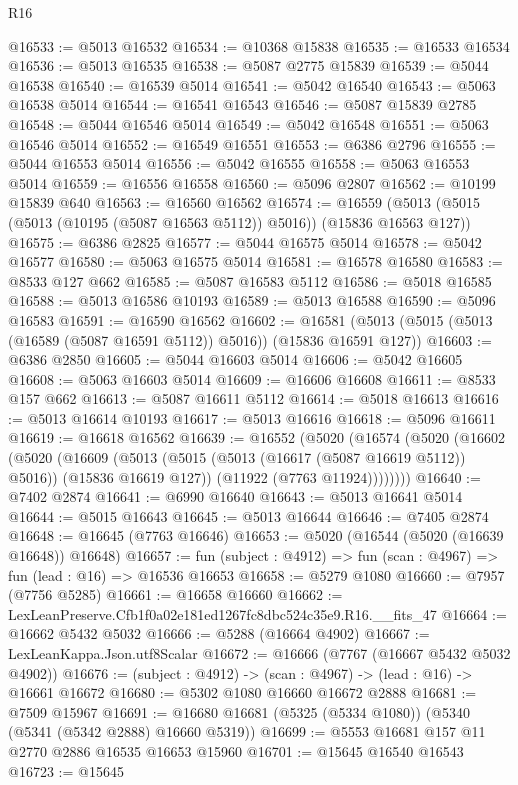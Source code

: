 \begin{lexlean}{R16}
\begin{coremodule}
@16533 := @5013 @16532
@16534 := @10368 @15838
@16535 := @16533 @16534
@16536 := @5013 @16535
@16538 := @5087 @2775 @15839
@16539 := @5044 @16538
@16540 := @16539 @5014
@16541 := @5042 @16540
@16543 := @5063 @16538 @5014
@16544 := @16541 @16543
@16546 := @5087 @15839 @2785
@16548 := @5044 @16546 @5014
@16549 := @5042 @16548
@16551 := @5063 @16546 @5014
@16552 := @16549 @16551
@16553 := @6386 @2796
@16555 := @5044 @16553 @5014
@16556 := @5042 @16555
@16558 := @5063 @16553 @5014
@16559 := @16556 @16558
@16560 := @5096 @2807
@16562 := @10199 @15839 @640
@16563 := @16560 @16562
@16574 := @16559 (@5013 (@5015 (@5013 (@10195 (@5087 @16563 @5112)) @5016)) (@15836 @16563 @127))
@16575 := @6386 @2825
@16577 := @5044 @16575 @5014
@16578 := @5042 @16577
@16580 := @5063 @16575 @5014
@16581 := @16578 @16580
@16583 := @8533 @127 @662
@16585 := @5087 @16583 @5112
@16586 := @5018 @16585
@16588 := @5013 @16586 @10193
@16589 := @5013 @16588
@16590 := @5096 @16583
@16591 := @16590 @16562
@16602 := @16581 (@5013 (@5015 (@5013 (@16589 (@5087 @16591 @5112)) @5016)) (@15836 @16591 @127))
@16603 := @6386 @2850
@16605 := @5044 @16603 @5014
@16606 := @5042 @16605
@16608 := @5063 @16603 @5014
@16609 := @16606 @16608
@16611 := @8533 @157 @662
@16613 := @5087 @16611 @5112
@16614 := @5018 @16613
@16616 := @5013 @16614 @10193
@16617 := @5013 @16616
@16618 := @5096 @16611
@16619 := @16618 @16562
@16639 := @16552
    (@5020
      (@16574
        (@5020
          (@16602
            (@5020
              (@16609
                (@5013 (@5015 (@5013 (@16617 (@5087 @16619 @5112)) @5016)) (@15836 @16619 @127))
                (@11922 (@7763 @11924))))))))
@16640 := @7402 @2874
@16641 := @6990 @16640
@16643 := @5013 @16641 @5014
@16644 := @5015 @16643
@16645 := @5013 @16644
@16646 := @7405 @2874
@16648 := @16645 (@7763 @16646)
@16653 := @5020 (@16544 (@5020 (@16639 @16648)) @16648)
@16657 := fun (subject : @4912) => fun (scan : @4967) => fun (lead : @16) => @16536 @16653
@16658 := @5279 @1080
@16660 := @7957 (@7756 @5285)
@16661 := @16658 @16660
@16662 := LexLeanPreserve.Cfb1f0a02e181ed1267fc8dbc524c35e9.R16.__fits_47
@16664 := @16662 @5432 @5032
@16666 := @5288 (@16664 @4902)
@16667 := LexLeanKappa.Json.utf8Scalar
@16672 := @16666 (@7767 (@16667 @5432 @5032 @4902))
@16676 := (subject : @4912) -> (scan : @4967) -> (lead : @16) -> @16661 @16672
@16680 := @5302 @1080 @16660 @16672 @2888
@16681 := @7509 @15967
@16691 := @16680 @16681 (@5325 (@5334 @1080)) (@5340 (@5341 (@5342 @2888) @16660 @5319))
@16699 := @5553 @16681 @157 @11 @2770 @2886 @16535 @16653 @15960
@16701 := @15645 @16540 @16543
@16723 := @15645

\end{coremodule}
\end{lexlean}
